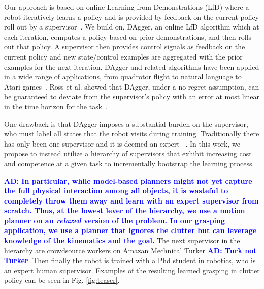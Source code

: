 \documentclass[10pt, conference]{ieeeconf}      %
\newcommand{\adnote}[1]{\ifthenelse{ \boolean{include-notes}}%
 {\textcolor{blue}{\textbf{AD: #1}}}{}}
\begin{document}
Our approach is based on online Learning from Demonstrations (LfD) where a robot iteratively learns a policy and is
provided by feedback on the current policy roll out by a supervisor~\cite{grollman2007dogged,ross2010efficient,ross2010reduction}. 
We build on, DAgger, an online LfD algorithm which at each iteration, computes a policy based on prior demonstrations,
and then rolls out that policy. A supervisor then provides control signals as feedback on the current policy
and new state/control examples are aggregated with the prior examples for the next iteration. DAgger and related algorithms have been applied in a wide range of applications, from quadrotor flight to natural language to Atari games~\cite{NIPS2014_5421,duvallet2013imitation,ross2013learning}. 
Ross et al. showed that DAgger, under a no-regret assumption, can be guaranteed to deviate from the supervisor's policy with an error
at most linear in the time horizon for the task~\cite{ross2010reduction}.

One drawback is that DAgger imposes a substantial burden on the supervisor, who must label all states that the robot
visits during training.  Traditionally there has only been one supervisor and it is deemed an expert
~\cite{ross2010efficient,ross2010reduction,ross2013learning,duvallet2013imitation}. In this work, we propose to instead
utilize a hierarchy of supervisors that exhibit increasing cost and competence at a given task to incrementally
bootstrap the learning process. 

\adnote{In particular, while model-based planners might not yet capture the full physical interaction among all objects, it is wasteful to completely throw them away and learn with an expert supervisor from scratch. Thus, at the lowest lever of the hierarchy, we use a motion planner on an \emph{relaxed} version of the problem. In our grasping application, we use a planner that ignores the clutter but can leverage knowledge of the kinematics and the goal.}
The next supervisor in the hierarchy are crowdsource workers on Amazan Mechnical Turker\adnote{Turk not Turker}. Then finally the robot is trained with a Phd student in robotics, who is an expert human supervisor. Examples of the resulting learned grasping in clutter policy can be seen in Fig. \ref{fig:teaser}. 

\end{document}
